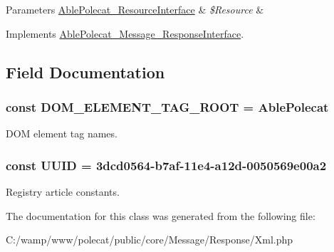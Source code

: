 \begin{DoxyParams}[1]{Parameters}
\hyperlink{interface_able_polecat___resource_interface}{Able\+Polecat\+\_\+\+Resource\+Interface} & {\em \$\+Resource} & \\
\hline
\end{DoxyParams}


Implements \hyperlink{interface_able_polecat___message___response_interface_a858ab2a95af7d312509c203de5c6fb11}{Able\+Polecat\+\_\+\+Message\+\_\+\+Response\+Interface}.



\subsection{Field Documentation}
\hypertarget{class_able_polecat___message___response___xml_ad23b3bef9ea0d362212e78bc8d37d629}{}
\subsubsection[{D\+O\+M\+\_\+\+E\+L\+E\+M\+E\+N\+T\+\_\+\+T\+A\+G\+\_\+\+R\+O\+O\+T}]{\setlength{\rightskip}{0pt plus 5cm}const D\+O\+M\+\_\+\+E\+L\+E\+M\+E\+N\+T\+\_\+\+T\+A\+G\+\_\+\+R\+O\+O\+T = \textquotesingle{}Able\+Polecat\textquotesingle{}}\label{class_able_polecat___message___response___xml_ad23b3bef9ea0d362212e78bc8d37d629}
D\+O\+M element tag names. \hypertarget{class_able_polecat___message___response___xml_a74b892c8c0b86bf9d04c5819898c51e7}{}
\subsubsection[{U\+U\+I\+D}]{\setlength{\rightskip}{0pt plus 5cm}const U\+U\+I\+D = \textquotesingle{}3dcd0564-\/b7af-\/11e4-\/a12d-\/0050569e00a2\textquotesingle{}}\label{class_able_polecat___message___response___xml_a74b892c8c0b86bf9d04c5819898c51e7}
Registry article constants. 

The documentation for this class was generated from the following file\+:\begin{DoxyCompactItemize}
\item 
C\+:/wamp/www/polecat/public/core/\+Message/\+Response/Xml.\+php\end{DoxyCompactItemize}
